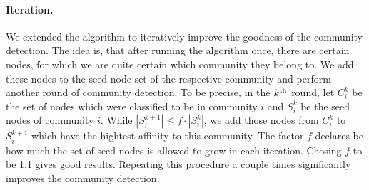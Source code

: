 \paragraph{Iteration.}
We extended the algorithm to iteratively improve the goodness of the community detection.
The idea is, that after running the algorithm once, there are
certain nodes, for which we are quite certain which community they belong to.
We add these nodes to the seed node set of the respective community
and perform another round of community detection.
To be precise, in the $k^{\textrm{th}}$ round, let $C^k_i$ be the set of nodes which were classified to be in community $i$ and $S^k_i$ be the seed nodes of community $i$.
While $| S^{k+1}_i | \le f \cdot | S^{k}_i |$, we add those nodes from $C^k_i$ to $S^{k+1}_i$ which have the hightest affinity to this community.
The factor $f$ declares be how much the set of seed nodes is allowed to grow in each iteration. 
Chosing $f$ to be 1.1 gives good results.
Repeating this procedure a couple times significantly improves the community detection.





